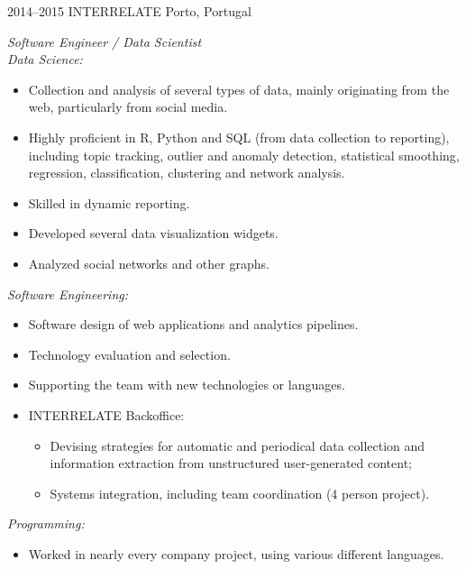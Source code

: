 \documentclass{friggeri-cv}
\begin{document}
\begin{entrylist}
\entry
{2014--2015}
{INTERRELATE}
{Porto, Portugal}
{\emph{Software Engineer / Data Scientist}\\[0.3em]
{\normalsize \emph{Data Science:}}
\vspace{0.175em}
{\footnotesize \begin{itemize}
  \setlength\itemsep{.0175em}
  \item Collection and analysis of several types of data, mainly originating from the web, particularly from social media.
  \item Highly proficient in R, Python and SQL (from data collection to reporting), including topic tracking, outlier and anomaly detection, statistical smoothing, regression, classification, clustering and network analysis.
  \item Skilled in dynamic reporting.
  \item Developed several data visualization widgets.
  \item Analyzed social networks and other graphs.
\end{itemize}}
\vspace{0.3em}
{\normalsize \emph{Software Engineering:}}
\vspace{0.175em}
{\footnotesize \begin{itemize}
  \setlength\itemsep{.0175em}
  \item Software design of web applications and analytics pipelines.
  \item Technology evaluation and selection.
  \item Supporting the team with new technologies or languages.
  \item INTERRELATE Backoffice:
    \begin{itemize}
      \item Devising strategies for automatic and periodical data collection and information extraction from unstructured user-generated content;
      \item Systems integration, including team coordination (4 person project).
    \end{itemize}
\end{itemize}}
\vspace{0.3em}
{\normalsize \emph{Programming:}}
\vspace{0.175em}
{\footnotesize \begin{itemize}
  \setlength\itemsep{.0175em}
  \item Worked in nearly every company project, using various different languages.

\end{itemize}}}
\end{entrylist}
\end{document}
